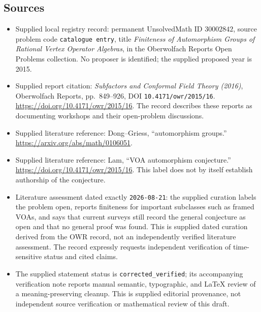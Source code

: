 \documentclass[11pt]{article}
\begin{document}
\subsection{Sources}
\begin{itemize}
\item Supplied local registry record: permanent UnsolvedMath ID \(30002842\), source problem code \texttt{catalogue entry}, title \emph{Finiteness of Automorphism Groups of Rational Vertex Operator Algebras}, in the Oberwolfach Reports Open Problems collection. No proposer is identified; the supplied proposed year is 2015.
\item Supplied report citation: \emph{Subfactors and Conformal Field Theory (2016)}, Oberwolfach Reports, pp.~849--926, DOI \texttt{10.4171/owr/2015/16}. \url{https://doi.org/10.4171/owr/2015/16}. The record describes these reports as documenting workshops and their open-problem discussions.
\item Supplied literature reference: Dong--Griess, ``automorphism groups.'' \url{https://arxiv.org/abs/math/0106051}.
\item Supplied literature reference: Lam, ``VOA automorphism conjecture.'' \url{https://doi.org/10.4171/owr/2015/16}. This label does not by itself establish authorship of the conjecture.
\item Literature assessment dated exactly \texttt{2026-08-21}: the supplied curation labels the problem open, reports finiteness for important subclasses such as framed VOAs, and says that current surveys still record the general conjecture as open and that no general proof was found. This is supplied dated curation derived from the OWR record, not an independently verified literature assessment. The record expressly requests independent verification of time-sensitive status and cited claims.
\item The supplied statement status is \texttt{corrected\_verified}; its accompanying verification note reports manual semantic, typographic, and LaTeX review of a meaning-preserving cleanup. This is supplied editorial provenance, not independent source verification or mathematical review of this draft.
\end{itemize}
\end{document}
